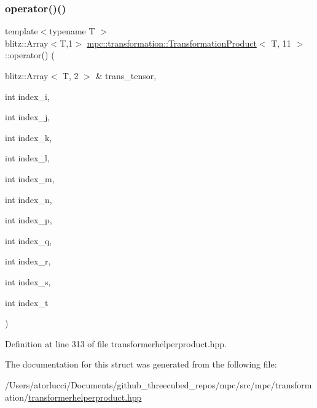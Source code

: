 \subsubsection{\texorpdfstring{operator()()}{operator()()}}
{\footnotesize\ttfamily template$<$typename T $>$ \\
blitz\+::\+Array$<$T,1$>$ \mbox{\hyperlink{structmpc_1_1transformation_1_1_transformation_product}{mpc\+::transformation\+::\+Transformation\+Product}}$<$ T, 11 $>$\+::operator() (\begin{DoxyParamCaption}\item[{blitz\+::\+Array$<$ T, 2 $>$ \&}]{trans\+\_\+tensor,  }\item[{int}]{index\+\_\+i,  }\item[{int}]{index\+\_\+j,  }\item[{int}]{index\+\_\+k,  }\item[{int}]{index\+\_\+l,  }\item[{int}]{index\+\_\+m,  }\item[{int}]{index\+\_\+n,  }\item[{int}]{index\+\_\+p,  }\item[{int}]{index\+\_\+q,  }\item[{int}]{index\+\_\+r,  }\item[{int}]{index\+\_\+s,  }\item[{int}]{index\+\_\+t }\end{DoxyParamCaption})\hspace{0.3cm}{\ttfamily [inline]}}



Definition at line 313 of file transformerhelperproduct.\+hpp.



The documentation for this struct was generated from the following file\+:\begin{DoxyCompactItemize}
\item 
/\+Users/atorlucci/\+Documents/github\+\_\+threecubed\+\_\+repos/mpc/src/mpc/transformation/\mbox{\hyperlink{transformerhelperproduct_8hpp}{transformerhelperproduct.\+hpp}}\end{DoxyCompactItemize}
